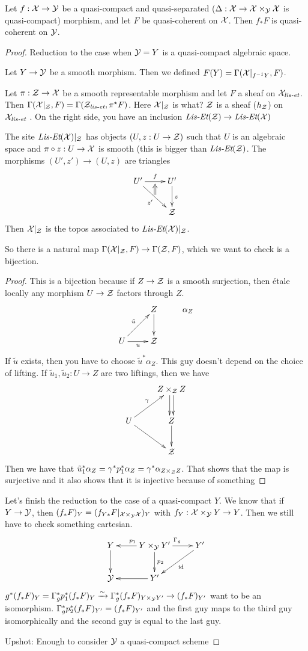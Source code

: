 \begin{proposition}
  Let $f:\mathcal{X}\to \mathcal{Y}$ be a quasi-compact and quasi-separated
  ($\Delta:\mathcal{X}\to \mathcal{X}\times_{\mathcal{Y}} \mathcal{X}$ is quasi-compact) morphism, and let $F$
  be quasi-coherent on $\mathcal{X}$. Then $f_* F$ is quasi-coherent on $\mathcal{Y}$.
\end{proposition}
\begin{proof}
 Reduction to the case when $\mathcal{Y}=Y$ is a quasi-compact algebraic space.

 Let $Y\to \mathcal{Y}$ be a smooth morphism. Then we defined $F(Y)=\Gamma(\mathcal{X}|_{f^{-1}Y},F)$.
 \begin{lemma}
  Let $\pi:\mathcal{Z}\to \mathcal{X}$ be a smooth representable morphism and let $F$ a sheaf on $\mathcal{X}_{\text{\it lis-et}}$. Then $\Gamma(\mathcal{X}|_{\mathcal{Z}},F)=\Gamma(\mathcal{Z}_{\text{\it lis-et}}, \pi^\star F)$. Here $\mathcal{X}|_{\mathcal{Z}}$ is what? $\mathcal{Z}$ is a sheaf ($h_{\mathcal{Z}}$) on $\mathcal{X}_{\text{\it lis-et}}$ . On the right side, you have an inclusion $\text{\it Lis-Et}(\mathcal{Z})\to \text{\it Lis-Et}(\mathcal{X})$
 \end{lemma}
 The site $\text{\it Lis-Et}(\mathcal{X})|_{\mathcal{Z}}$ has objects $(U,z:U\to \mathcal{Z})$ such that $U$ is an algebraic space and $\pi\circ z:U\to \mathcal{X}$ is smooth (this is bigger than $\text{\it Lis-Et}(\mathcal{Z})$. The morphisms $(U',z')\to (U,z)$ are triangles
\[\xymatrix{
 U'\ar[r]^f_{}="b" \ar[dr]_{z'}^{}="a" & U'\ar[d]^z\\
 & \Z
 \ar@{=>} "a";"b"
}\]
 Then $\mathcal{X}|_{\mathcal{Z}}$ is the topos associated to $\text{\it Lis-Et}(\mathcal{X})|_{\mathcal{Z}}$.

 So there is a natural map $\Gamma(\mathcal{X}|_{\mathcal{Z}},F)\to \Gamma(\mathcal{Z},F)$, which we want to check is a bijection.
 \begin{proof}
  This is a bijection because if $Z\to \mathcal{Z}$ is a smooth surjection, then \'etale locally any morphism $U\to \mathcal{Z}$ factors through $Z$.
  \[\xymatrix{
   & Z\ar[d]& \alpha_Z\\
   U\ar[r]_u \ar[ur]^{\tilde u} & \Z
  }\]
  If $\tilde u$ exists, then you have to choose $\tilde u^*\alpha_Z$. This guy doesn't depend on the choice of lifting. If $\tilde u_1,\tilde u_2:U\to Z$ are two liftings, then we have
\[\xymatrix{
  & Z\times_\Z Z \ar@<.5ex>[d]\ar@<-.5ex>[d] \\
  U \ar[ur]^\gamma \ar[dr] & Z\ar[d]\\
 & \Z
}\]
Then we have that $\tilde u_1^* \alpha_Z=\gamma^*p_1^* \alpha_Z=\gamma^* \alpha_{Z\times_{\mathcal{Z}} Z}$. That shows that the map is surjective and it also shows that it is injective because of something \anton{}
 \end{proof}
Let's finish the reduction to the case of a quasi-compact $Y$. We know that if $Y\to \mathcal{Y}$, then $(f_*F)_Y=(f_{Y*}F|_{\mathcal{X}\times_{\mathcal{Y}}\mathcal{X}})_Y$ with $f_Y:\mathcal{X}\times_{\mathcal{Y}} Y \to Y$. Then we still have to check something cartesian.
\[\xymatrix{
 Y\ar[d] & Y\times_\Y Y'\ar[l]_{p_1} \ar[d]^{p_2} \ar[r]^{\Ga_g} & Y'\ar[dl]^\id\\
\Y & Y'\ar[l]
}\]
$g^*(f_*F)_Y = \Gamma_g^*p_1^*(f_*F)_Y\xrightarrow\sim \Gamma_g^*(f_*F)_{Y\times_{\mathcal{Y}} Y'}\to (f_*F)_{Y'}$ want to be an isomorphism. $\Gamma_g^* p_2^* (f_* F)_{Y'}= (f_* F)_{Y'}$ and the first guy maps to the third guy isomorphically and the second guy is equal to the last guy.

Upshot: Enough to consider $\mathcal{Y}$ a quasi-compact scheme

\end{proof}
